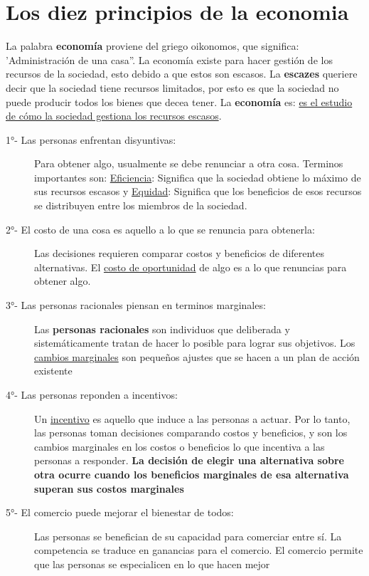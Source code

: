 \section{Los diez principios de la economia}

La palabra \textbf{economía} proviene del griego oikonomos, que significa: 'Administración de una casa''. 
La economía existe para hacer gestión de los recursos de la sociedad, esto debido a que estos son escasos. 
La \textbf{escazes} queriere decir que la sociedad tiene recursos limitados, por esto es que la sociedad no puede
producir todos los bienes que decea tener. La {\bf economía} es: \underline{es el estudio de cómo la sociedad gestiona los recursos escasos}.


\begin{description}
  \item [\large 1°- Las personas enfrentan disyuntivas:] Para obtener algo, usualmente se debe renunciar a otra cosa. Terminos importantes son: \underline{Eficiencia}: Significa que la sociedad obtiene lo máximo de sus recursos escasos y \underline{Equidad}: Significa que los beneficios de esos recursos se distribuyen entre los miembros de la sociedad.
  \item [\large 2°- El costo de una cosa es aquello a lo que se renuncia para obtenerla:] Las decisiones requieren comparar costos y beneficios de diferentes alternativas. El \underline{costo de oportunidad} de algo es a lo que renuncias para obtener algo.
  \item [\large 3°- Las personas racionales piensan en terminos marginales:] Las {\bf personas racionales} son individuos que deliberada y sistemáticamente tratan de hacer lo posible para lograr sus objetivos. Los \underline{cambios marginales} son pequeños ajustes que se hacen a un plan de acción existente
  \item [\large 4°- Las personas reponden a incentivos:] Un \underline{incentivo} es aquello que induce a las personas a actuar. Por lo tanto, las personas toman decisiones comparando costos y beneficios, y son los cambios marginales en los costos o beneficios lo que incentiva a las personas a responder. {\bf La decisión de elegir una alternativa sobre otra ocurre cuando los beneficios marginales de esa alternativa superan sus costos marginales}
  \item [\large 5°- El comercio puede mejorar el bienestar de todos:] Las personas se benefician de su capacidad para comerciar entre sí. La competencia se traduce en ganancias para el comercio. El comercio permite que las personas se especialicen en lo que hacen mejor

\end{description}
